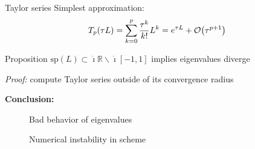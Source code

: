 \documentclass{beamer}
\newcommand{\xmark}{{\color{mred}\ding{55}}}
\newcommand{\mbold}[1]{{\textbf{\color{PLB}#1}}}
\newcommand{\I}{\dot{\imath}}
\begin{document}
\begin{frame}{Taylor series}
  Simplest approximation:
  $$
    T_p(\tau L) = \sum_{k=0}^p \frac{\tau^k}{k!}L^k = e^{\tau L} + \order{\tau^{p+1}}
  $$

  \begin{block}{Proposition}
    $\text{sp}(L)\subset\I\mathbb{R}\smallsetminus\I[-1,1]$ implies eigenvalues diverge
  \end{block}
  \emph{Proof:} compute Taylor series outside of its convergence radius

  \mbold{Conclusion:}
  \begin{description}
    \item[\xmark] Bad behavior of eigenvalues
    \item[\xmark] Numerical instability in scheme
  \end{description}
\end{frame}
\end{document}
